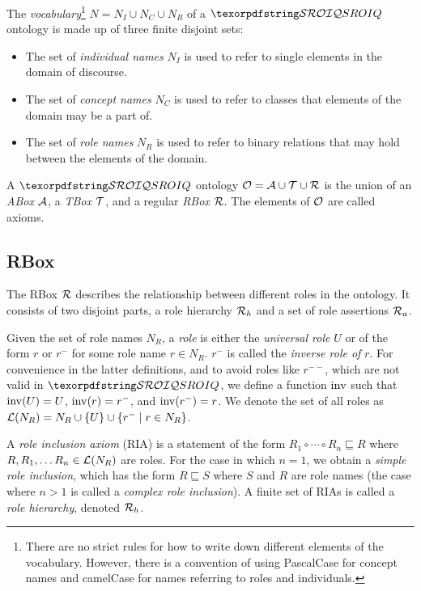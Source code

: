 
The \emph{vocabulary}\footnote{There are no strict rules for how to write down different elements of the vocabulary. However, there is a convention of using PascalCase for concept names and camelCase for names referring to roles and individuals.} $N = N_I \cup N_C \cup N_R$ of a $\SROIQ$ ontology is made up of three finite disjoint sets:
\begin{itemize}
  \item The set of \emph{individual names} $N_I$ is used to refer to single elements in the domain of discourse.
  \item The set of \emph{concept names} $N_C$ is used to refer to classes that elements of the domain may be a part of.
  \item The set of \emph{role names} $N_R$ is used to refer to binary relations that may hold between the elements of the domain.
\end{itemize}
A $\SROIQ$ ontology $\mathcal{O} = \mathcal{A} \cup \mathcal{T} \cup \mathcal{R}$ is the union of an \emph{ABox} $\mathcal{A}$, a \emph{TBox} $\mathcal{T}$, and a regular \emph{RBox} $\mathcal{R}$. The elements of $\mathcal{O}$ are called axioms.

\subsection{RBox} \label{rbox}

The RBox $\mathcal{R}$ describes the relationship between different roles in the ontology. It consists of two disjoint parts, a role hierarchy $\mathcal{R}_h$ and a set of role assertions $\mathcal{R}_a$.

Given the set of role names $N_R$, a \emph{role} is either the \emph{universal role} $U$ or of the form $r$ or $r^-$ for some role name $r \in N_R$. $r^-$ is called the \emph{inverse role of} $r$. For convenience in the latter definitions, and to avoid roles like $r^{--}$, which are not valid in $\SROIQ$, we define a function $\operatorname{inv}$ such that $\operatorname{inv}(U) = U$, $\operatorname{inv}(r) = r^-$, and $\operatorname{inv}(r^-) = r$. We denote the set of all roles as $\mathcal{L}(N_R) = N_R \cup \{ U \} \cup \{ r^- \mid r \in N_R \}$.

A \emph{role inclusion axiom} (RIA) is a statement of the form $R_1 \circ \cdots \circ R_n \sqsubseteq R$ where $R, R_1, \dots R_n \in \mathcal{L}(N_R)$ are roles. For the case in which $n = 1$, we obtain a \emph{simple role inclusion}, which has the form $R \sqsubseteq S$ where $S$ and $R$ are role names (the case where $n > 1$ is called a \emph{complex role inclusion}). A finite set of RIAs is called a \emph{role hierarchy}, denoted $\mathcal{R}_h$.

